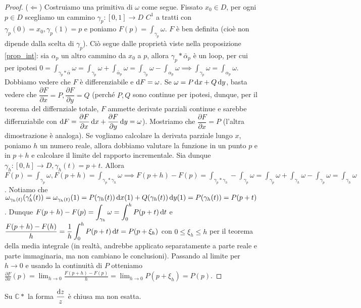 \begin{proof}
  ($\Leftarrow$) Costruiamo una primitiva di $\omega$ come segue. Fissato $x_0 \in D$, per ogni $p \in D$ scegliamo un cammino $\gamma_p:[0, 1] \longrightarrow D$ $C^1$ a tratti con $\gamma_p(0)=x_0, \gamma_p(1)=p$ e poniamo $\displaystyle F(p)=\int_{\gamma_p} \omega$. $F$ è ben definita (cioè non dipende dalla scelta di $\gamma_p$).
  Ciò segue dalle proprietà viste nella proposizione \ref{prop_int}: sia $\alpha_p$ un altro cammino da $x_0$ a $p$, allora $\gamma_p*\bar{\alpha}_p$ è un loop, per cui per ipotesi $\displaystyle 0=\int_{\gamma_p*\bar{\alpha}} \omega=\int_{\gamma_p} \omega+\int_{\bar{\alpha}_p} \omega=\int_{\gamma_p} \omega-\int_{\alpha_p} \omega \implies \int_{\gamma_p} \omega=\int_{\alpha_p} \omega$.
  Dobbiamo vedere che $F$ è differenziabile e $\mathop{}\!\mathrm{d} F=\omega$. Se $\omega=P\mathop{}\!\mathrm{d} x+Q\mathop{}\!\mathrm{d} y$, basta vedere che $\dfrac{\partial F}{\partial x}=P, \dfrac{\partial F}{\partial y}=Q$ (perché $P, Q$ sono continue per ipotesi, dunque, per il teorema del differnziale totale, $F$ ammette derivate parziali continue e sarebbe differnziabile con $\mathop{}\!\mathrm{d} F=\dfrac{\partial F}{\partial x}\mathop{}\!\mathrm{d} x+\dfrac{\partial F}{\partial y}\mathop{}\!\mathrm{d} y=\omega$).
  Mostriamo che $\dfrac{\partial F}{\partial x}=P$ (l'altra dimostrazione è analoga). Se vogliamo calcolare la derivata parziale lungo $x$, poniamo $h$ un numero reale, allora dobbiamo valutare la funzione in un punto $p$ e in $p+h$ e calcolare il limite del rapporto incrementale. Sia dunque $\gamma_h:[0, h] \longrightarrow D, \gamma_h(t)=p+t$.
  Allora $\displaystyle F(p)=\int_{\gamma_p} \omega, F(p+h)=\int_{\gamma_p*\gamma_h} \omega \implies F(p+h)-F(p)=\int_{\gamma_p*\gamma_h}-\int_{\gamma_p} \omega=\int_{\gamma_p} \omega+\int_{\gamma_h} \omega-\int_{\gamma_p} \omega=\int_{\gamma_h} \omega$.
  Notiamo che $\omega_{\gamma_h(t)}(\gamma_h'(t))=\omega_{\gamma_h(t)}(1)=P(\gamma_h(t))\mathop{}\!\mathrm{d} x(1)+Q(\gamma_h(t)) \mathop{}\!\mathrm{d} y(1)=P(\gamma_h(t))=P(p+t)$.
  Dunque $\displaystyle F(p+h)-F(p)=\int_{\gamma_h} \omega=\int_0^h P(p+t)\mathop{}\!\mathrm{d} t$ e $\displaystyle \frac{F(p+h)-F(h)}{h}=\frac{1}{h}\int_0^h P(p+t)\mathop{}\!\mathrm{d} t=P(p+\xi_h)$ con $0 \le \xi_h \le h$ per il teorema della media integrale (in realtà, andrebbe applicato separatamente a parte reale e parte immaginaria, ma non cambiano le conclusioni).
  Passando al limite per $h \longrightarrow 0$ e usando la continuità di $P$ otteniamo $\displaystyle \frac{\partial F}{\partial x}(p)=\lim_{h \longrightarrow 0} \frac{F(p+h)-F(p)}{h}=\lim_{h \longrightarrow 0} P(p+\xi_h)=P(p)$.
\end{proof}

\begin{cor}
  Su $\mathbb{C}*$ la forma $\dfrac{\mathop{}\!\mathrm{d} z}{z}$ è chiusa ma non esatta.
\end{cor}

